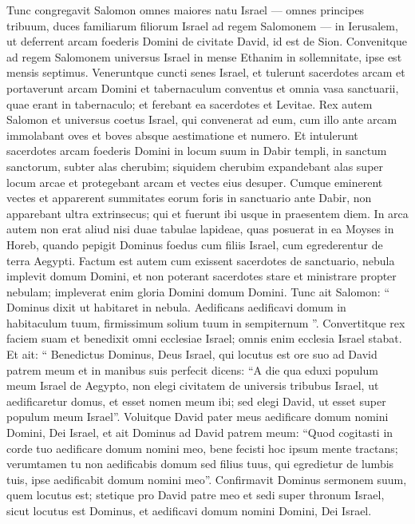 \begin{biblechapter}
\begin{biblechapter}
\begin{biblechapter}
\begin{biblechapter}
\begin{biblechapter}
\begin{biblechapter}
\begin{biblechapter}
\begin{biblechapter}
\verse Tunc congregavit Salomon omnes maiores natu Israel — omnes principes tribuum, duces familiarum filiorum Israel ad regem Salomonem — in Ierusalem, ut deferrent arcam foederis Domini de civitate David, id est de Sion. 
\verse Convenitque ad regem Salomonem universus Israel in mense Ethanim in sollemnitate, ipse est mensis septimus. 
\verse Veneruntque cuncti senes Israel, et tulerunt sacerdotes arcam 
\verse et portaverunt arcam Domini et tabernaculum conventus et omnia vasa sanctuarii, quae erant in tabernaculo; et ferebant ea sacerdotes et Levitae. 
\verse Rex autem Salomon et universus coetus Israel, qui convenerat ad eum, cum illo ante arcam immolabant oves et boves absque aestimatione et numero. 
\verse Et intulerunt sacerdotes arcam foederis Domini in locum suum in Dabir templi, in sanctum sanctorum, subter alas cherubim; 
\verse siquidem cherubim expandebant alas super locum arcae et protegebant arcam et vectes eius desuper. 
\verse Cumque eminerent vectes et apparerent summitates eorum foris in sanctuario ante Dabir, non apparebant ultra extrinsecus; qui et fuerunt ibi usque in praesentem diem. 
\verse In arca autem non erat aliud nisi duae tabulae lapideae, quas posuerat in ea Moyses in Horeb, quando pepigit Dominus foedus cum filiis Israel, cum egrederentur de terra Aegypti.
 \verse Factum est autem cum exissent sacerdotes de sanctuario, nebula implevit domum Domini, 
\verse et non poterant sacerdotes stare et ministrare propter nebulam; impleverat enim gloria Domini domum Domini. 
\verse Tunc ait Salomon:
 “ Dominus dixit ut habitaret in nebula.
 \verse Aedificans aedificavi domum in habitaculum tuum,
 firmissimum solium tuum in sempiternum ”.
 \verse Convertitque rex faciem suam et benedixit omni ecclesiae Israel; omnis enim ecclesia Israel stabat. 
\verse Et ait: “ Benedictus Dominus, Deus Israel, qui locutus est ore suo ad David patrem meum et in manibus suis perfecit dicens: 
 \verse “A die qua eduxi populum meum Israel de Aegypto, non elegi civitatem de universis tribubus Israel, ut aedificaretur domus, et esset nomen meum ibi; sed elegi David, ut esset super populum meum Israel”. 
\verse Voluitque David pater meus aedificare domum nomini Domini, Dei Israel, 
\verse et ait Dominus ad David patrem meum: “Quod cogitasti in corde tuo aedificare domum nomini meo, bene fecisti hoc ipsum mente tractans; 
\verse verumtamen tu non aedificabis domum sed filius tuus, qui egredietur de lumbis tuis, ipse aedificabit domum nomini meo”. 
\verse Confirmavit Dominus sermonem suum, quem locutus est; stetique pro David patre meo et sedi super thronum Israel, sicut locutus est Dominus, et aedificavi domum nomini Domini, Dei Israel. 

\end{biblechapter}
\end{biblechapter}
\end{biblechapter}
\end{biblechapter}
\end{biblechapter}
\end{biblechapter}
\end{biblechapter}
\end{biblechapter}
